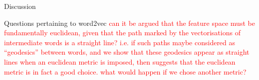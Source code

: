 \documentclass{article} %
\begin{document}
\begin{section}{Discussion}
\begin{subsection}{Questions pertaining to word2vec}
\textcolor{red}{can it be argued that the feature space must be fundamentally euclidean, given that the path marked by the vectorisations of intermediate words is a straight line? i.e. if such paths maybe considered as ``geodesics'' between words, and we show that these geodesics appear as straight lines when an euclidean metric is imposed, then suggests that the euclidean metric is in fact a good choice.  what would happen if we chose another metric?}

\end{subsection}

\end{section}

\clearpage
\footnotesize


\end{document}
